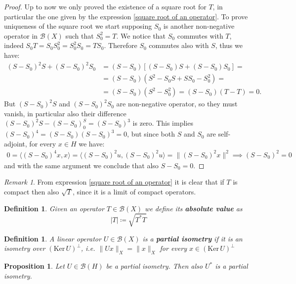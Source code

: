 \documentclass[corpo=11pt, stile=classica, tipotesi=custom,
greek, evenboxes, english]{toptesi}
\numberwithin{equation}{chapter}
\newtheorem{defi}[teo]{Definition}
\newtheorem{prop}[teo]{Proposition}
\theoremstyle{remark}
\newtheorem*{remark}{Remark}
\newcommand{\B}{\mathscr{B}} %
\begin{document}
\begin{proof}
	Up to now we only proved the existence of a square root for $T$, in particular the one given by the expression \eqref{square root of an operator}. To prove uniqueness of the square root we start supposing $S_0$ is another non-negative operator in $\B(X)$ such that $S_0^2 = T$. We notice that $S_0$ commutes with $T$, indeed $S_0 T = S_0 S_0^2 = S_0^2 S_0 = T S_0$. Therefore $S_0$ commutes also with $S$, thus we have:
	\begin{align*}
		(S-S_0)^2S + (S-S_0)^2S_0 &= (S-S_0)[(S-S_0)S + (S-S_0)S_0] =\\
								  &= (S-S_0)(S^2 - S_0S + SS_0 -S_0^2) =\\
								  &= (S-S_0)(S^2 - S_0^2) = (S-S_0)(T-T)=0.
	\end{align*}
	But $(S-S_0)^2 S$ and $(S-S_0)^2 S_0$ are non-negative operator, so they must vanish, in particular also their difference $(S-S_0)^2 S - (S-S_0)^ S_0 = (S-S_0)^3$ is zero. This implies $(S-S_0)^4 = (S-S_0) (S-S_0)^3 = 0$, but since both $S$ and $S_0$ are self-adjoint, for every $x \in H$ we have:
	\begin{align*}
		0 = \langle (S-S_0)^4 x,x \rangle = \langle (S-S_0)^2 u, (S-S_0)^2 u \rangle =  \|(S-S_0)^2 x\|^2 \implies (S-S_0)^2 = 0
	\end{align*}
	and with the same argument we conclude that also $S-S_0 = 0$.
\end{proof}
\begin{remark}
	From expression \eqref{square root of an operator} it is clear that if $T$ is compact then also $\sqrt{T}$, since it is a limit of compact operators.
\end{remark}
\begin{defi}\label{absolute value of an operator definition}
	Given an operator $T \in \B(X)$ we define its \textbf{absolute value} as
	\begin{equation}\label{absolute value of an operator formula}
		|T| \coloneqq \sqrt{T^*T}
	\end{equation}
\end{defi}
\begin{defi}\label{partial isometry}
	A linear operator $U \in \B(X)$ is a \textbf{partial isometry} if it is an isometry over $(\mathrm{Ker}\,U)^{\perp}$, i.e. $\|Ux\|_X = \|x\|_X$ for every $x \in (\mathrm{Ker}\,U)^{\perp}$
\end{defi}
\begin{prop}\label{U^* is a partial isometry}
	Let $U \in \B(H)$ be a partial isometry. Then also $U^*$ is a partial isometry.
\end{prop}
\end{document}
